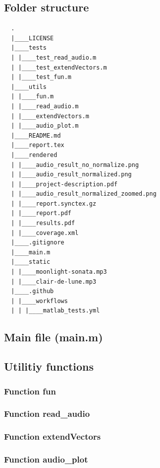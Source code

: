 \documentclass[a4paper,12pt]{article}
\begin{document}
\subsection*{Folder structure}
\begin{verbatim}
  .
  |____LICENSE
  |____tests
  | |____test_read_audio.m
  | |____test_extendVectors.m
  | |____test_fun.m
  |____utils
  | |____fun.m
  | |____read_audio.m
  | |____extendVectors.m
  | |____audio_plot.m
  |____README.md
  |____report.tex
  |____rendered
  | |____audio_result_no_normalize.png
  | |____audio_result_normalized.png
  | |____project-description.pdf
  | |____audio_result_normalized_zoomed.png
  | |____report.synctex.gz
  | |____report.pdf
  | |____results.pdf
  | |____coverage.xml
  |____.gitignore
  |____main.m
  |____static
  | |____moonlight-sonata.mp3
  | |____clair-de-lune.mp3
  |____.github
  | |____workflows
  | | |____matlab_tests.yml

\end{verbatim}

\subsection*{Main file (main.m)}


\pagebreak
\subsection*{Utilitiy functions}

\subsubsection*{Function fun}

\subsubsection*{Function read\_audio}

\subsubsection*{Function extendVectors}

\subsubsection*{Function audio\_plot}

\end{document}
